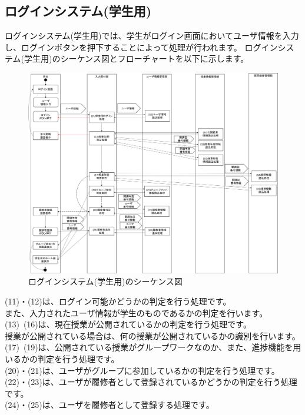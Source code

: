\clearpage

\subsection{ログインシステム(学生用)}
ログインシステム(学生用)では、学生がログイン画面においてユーザ情報を入力し、ログインボタンを押下することによって処理が行われます。
ログインシステム(学生用)のシーケンス図とフローチャートを以下に示します。

\begin{figure}[htbp]
  \begin{center}
    \includegraphics[width=1\linewidth,clip]{./img/seq5.png}
    \caption{ログインシステム(学生用)のシーケンス図}\label{fig:seq5}
  \end{center}
\end{figure}

(11)・(12)は、ログイン可能かどうかの判定を行う処理です。\\
また、入力されたユーザ情報が学生のものであるかの判定を行います。\\
(13)~(16)は、現在授業が公開されているかの判定を行う処理です。\\
授業が公開されている場合は、何の授業が公開されているかの識別を行います。\\
(17)~(19)は、公開されている授業がグループワークなのか、また、進捗機能を用いるかの判定を行う処理です。\\
(20)・(21)は、ユーザがグループに参加しているかの判定を行う処理です。\\
(22)・(23)は、ユーザが履修者として登録されているかどうかの判定を行う処理です。\\
(24)・(25)は、ユーザを履修者として登録する処理です。

